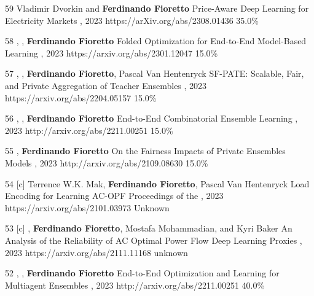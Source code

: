 \begin{pubs}
\confentry
	{59}
 	{Vladimir Dvorkin and {\bf Ferdinando Fioretto}}
  	{Price-Aware Deep Learning for Electricity Markets}
  	{, 2023}
  	{https://arXiv.org/abs/2308.01436}
  	{35.0\%}

\confentry 
	{58} %
	{, , {\bf Ferdinando Fioretto}}
	{Folded Optimization for End-to-End Model-Based Learning}
	{\procIJCAI, 2023}
	{https://arxiv.org/abs/2301.12047}
	{15.0\%}

\confentry
    {57} %
	{, , {\bf Ferdinando Fioretto}, Pascal Van Hentenryck}
	{SF-PATE: Scalable, Fair, and Private Aggregation of Teacher Ensembles}
    {\procIJCAI, 2023}
	{https://arxiv.org/abs/2204.05157}
    {15.0\%}

\confentry
    {56} %
	{, , {\bf Ferdinando Fioretto}}
	{End-to-End Combinatorial Ensemble Learning}
    {\procIJCAI, 2023}
	{http://arxiv.org/abs/2211.00251}
    {15.0\%}

\confentry
    {55} %
	{, {\bf Ferdinando Fioretto}}
	{On the Fairness Impacts of Private Ensembles Models}
    {\procIJCAI, 2023}
	{http://arxiv.org/abs/2109.08630}
    {15.0\%}

\confentry
	{54} %
	{[c] Terrence W.K. Mak, {\bf Ferdinando Fioretto}, Pascal Van Hentenryck}
	{Load Encoding for Learning AC-OPF}
	{Proceedings of the , 2023}
	{https://arxiv.org/abs/2101.03973}
	{Unknown}

\confentry
	{53}
	{[c] , {\bf Ferdinando Fioretto}, Mostafa Mohammadian, and Kyri Baker}
	{An Analysis of the Reliability of AC Optimal Power Flow Deep Learning Proxies}
	{, 2023}
	{https://arxiv.org/abs/2111.11168}
	{unknown}

\confentry
    {52} %
	{, , {\bf Ferdinando Fioretto}}
	{End-to-End Optimization and Learning for Multiagent Ensembles}
    {\procAAMAS, 2023}
	{http://arxiv.org/abs/2211.00251}
    {40.0\%}



\end{pubs}
